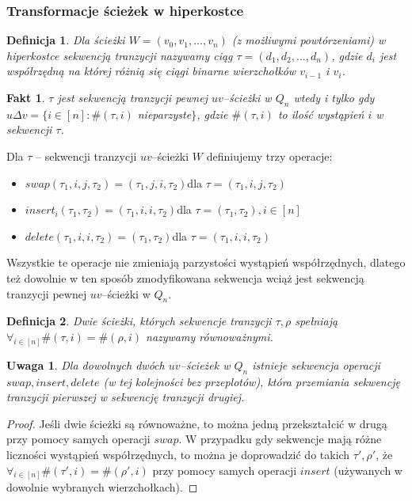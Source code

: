 \documentclass{pracamgr}
\newtheorem{defi}{Definicja}[section] %
\newtheorem{remark}[theorem]{Uwaga}
\newtheorem{fact}[theorem]{Fakt}
\begin{document}
    \subsubsection{Transformacje ścieżek w hiperkostce}
     \begin{defi}\label{sekwencja tranzycji}
      Dla ścieżki $W=(v_0,v_1,...,v_n)$ (z możliwymi powtórzeniami) w hiperkostce \emph{sekwencją tranzycji} nazywamy ciąg $\tau=(d_1,d_2,...,d_n)$,
      gdzie $d_i$ jest współrzędną na której różnią się ciągi binarne wierzchołków $v_{i-1}$ i $v_i$.
     \end{defi}
     \begin{fact}\label{sekwencja tranzycji - parzystość}
      $\tau$ jest sekwencją tranzycji pewnej $uv$--ścieżki w $Q_n$ wtedy i tylko gdy\newline
      $u\Delta v=\{i\in[n]:\#(\tau,i)$ nieparzyste$\}$,
      gdzie $\#(\tau,i)$ to ilość wystąpień $i$ w sekwencji $\tau$.
     \end{fact}
     Dla $\tau$ -- sekwencji tranzycji $uv$--ścieżki $W$ definiujemy trzy operacje:
     \begin{itemize}
      \item $swap(\tau_1,i,j,\tau_2)=(\tau_1,j,i,\tau_2)$\quad dla $\tau=(\tau_1,i,j,\tau_2)$
      \item $insert_i(\tau_1,\tau_2)=(\tau_1,i,i,\tau_2)$\quad dla $\tau=(\tau_1,\tau_2),i\in[n]$
      \item $delete(\tau_1,i,i,\tau_2)=(\tau_1,\tau_2)$\quad dla $\tau=(\tau_1,i,i,\tau_2)$
     \end{itemize}
     Wszystkie te operacje nie zmieniają parzystości wystąpień współrzędnych, dlatego też dowolnie w ten sposób zmodyfikowana sekwencja
     wciąż jest sekwencją tranzycji pewnej $uv$--ścieżki w $Q_n$.
     \begin{defi}\label{sciezki rownowazne}
      Dwie ścieżki, których sekwencje tranzycji $\tau,\rho$ spełniają $\forall_{i\in[n]}\#(\tau,i)=\#(\rho,i)$ nazywamy \emph{równoważnymi}.
     \end{defi}
     \begin{remark}\label{przeksztalcanie sciezek}
      Dla dowolnych dwóch $uv$--ścieżek w $Q_n$ istnieje sekwencja operacji $swap,insert,delete$ (w tej kolejności bez przeplotów),
      która przemiania sekwencję tranzycji pierwszej w sekwencję tranzycji drugiej.
     \end{remark}
     \begin{proof}
      Jeśli dwie ścieżki są równoważne, to można jedną przekształcić w drugą przy pomocy samych operacji $swap$.\newline
      W przypadku gdy sekwencje mają różne liczności wystąpień współrzędnych, to można je doprowadzić do takich $\tau',\rho'$,
      że $\forall_{i\in[n]}\#(\tau',i)=\#(\rho',i)$ przy pomocy samych operacji $insert$ (używanych w dowolnie wybranych wierzchołkach).
     \end{proof}
\end{document}
